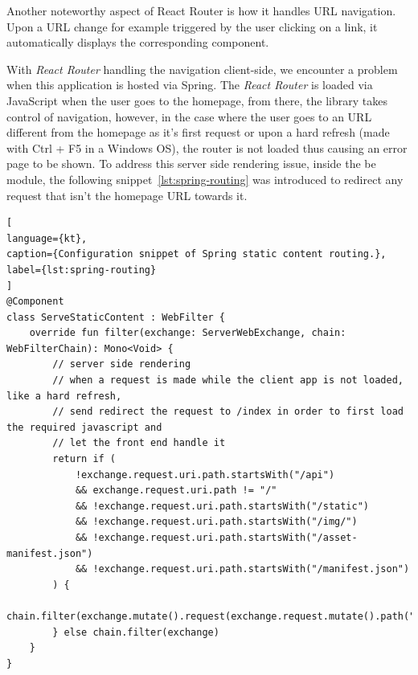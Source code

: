 Another noteworthy aspect of React Router is how it handles URL navigation. Upon a URL change for example triggered by the user clicking on a link, it automatically displays the corresponding component. 

With \textit{React Router} handling the navigation client-side, we encounter a problem when this application is hosted via Spring. The \textit{React Router} is loaded via JavaScript when the user goes to the homepage, from there, the library takes control of navigation, however, in the case where the user goes to an URL different from the homepage as it's first request or upon a hard refresh (made with Ctrl + F5 in a Windows OS), the router is not loaded thus causing an error page to be shown.
To address this server side rendering issue, inside the \acrshort{be} module, the following snippet~\ref{lst:spring-routing} was introduced to redirect any request that isn't the homepage URL towards it.

\begin{lstlisting}[
language={kt},
caption={Configuration snippet of Spring static content routing.},
label={lst:spring-routing}
]
@Component
class ServeStaticContent : WebFilter {
    override fun filter(exchange: ServerWebExchange, chain: WebFilterChain): Mono<Void> {
        // server side rendering
        // when a request is made while the client app is not loaded, like a hard refresh,
        // send redirect the request to /index in order to first load the required javascript and
        // let the front end handle it
        return if (
            !exchange.request.uri.path.startsWith("/api")
            && exchange.request.uri.path != "/"
            && !exchange.request.uri.path.startsWith("/static")
            && !exchange.request.uri.path.startsWith("/img/")
            && !exchange.request.uri.path.startsWith("/asset-manifest.json")
            && !exchange.request.uri.path.startsWith("/manifest.json")
        ) {
            chain.filter(exchange.mutate().request(exchange.request.mutate().path("/index.html").build()).build())
        } else chain.filter(exchange)
    }
}
\end{lstlisting}



